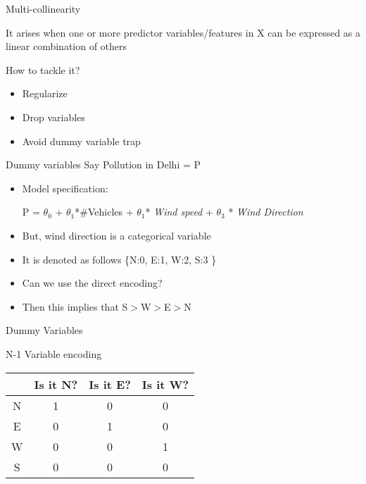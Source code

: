 \documentclass{beamer}
\begin{document}
    \begin{frame}{Multi-collinearity}
    
    It arises when one or more predictor variables/features in X can be expressed as a linear combination of others\\
    \vspace{5mm}
    
    
    
    How to tackle it?
    \begin{itemize}
        \item<+-> Regularize
        \item<+-> Drop variables
        \item<+-> Avoid dummy variable trap
    \end{itemize}
    \end{frame}
    \begin{frame}{Dummy variables}
    Say Pollution in Delhi = P
    \begin{itemize}[<+->]
        \item Model specification:
            \begin{center}
            P = $\theta_{0}$ + $\theta_{1}$*\#Vehicles + $\theta_{1}$*
            \textit{Wind speed} + $\theta_{3}$ * \textit{Wind Direction}
            \end{center}
        \item But, wind direction is a categorical variable
        \item It is denoted as follows \{N:0, E:1, W:2, S:3 \}
        \item Can we use the direct encoding?
        \item Then this implies that S$>$W$>$E$>$N
    \end{itemize}
    \end{frame}
    
    \begin{frame}{Dummy Variables}
    \begin{center}
    
    N-1 Variable encoding\\
    \vspace{1em}
    \begin{tabular}{|c|c|c|c|}
        \hline
        & Is it N? &Is it E? &Is it W?\\
        \hline
        \hline
        N & 1&0&0 \\
        E & 0&1&0\\
        W & 0&0&1\\
        S & 0&0&0\\
        \hline
    \end{tabular}
    
    \end{center}
    \end{frame}
    
\end{document}
